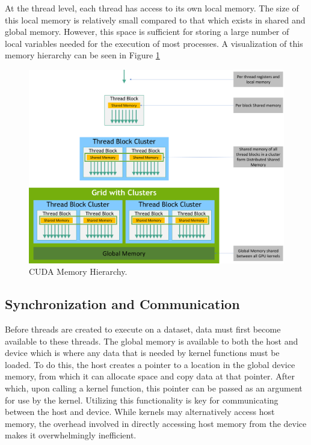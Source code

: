 \documentclass[11pt]{report}
\begin{document}
    At the thread level, each thread has access to its own local memory. The size of this local memory is relatively small compared to that which exists in shared and global memory. However, this space is sufficient for storing a large number of local variables needed for the execution of most processes. A visualization of this memory hierarchy can be seen in Figure \ref{fig:CUDA-Mem_Hierarchy}

    \begin{figure}[!h]
        \centering
        \includegraphics[width=\textwidth]{Images/memory-hierarchy.png}
        \caption{CUDA Memory Hierarchy\cite{CPP_GUIDE}.}
        \label{fig:CUDA-Mem_Hierarchy}
    \end{figure}

    

    \subsection{Synchronization and Communication}
    Before threads are created to execute on a dataset, data must first become available to these threads. The global memory is available to both the host and device which is where any data that is needed by kernel functions must be loaded. To do this, the host creates a pointer to a location in the global device memory, from which it can allocate space and copy data at that pointer. After which, upon calling a kernel function, this pointer can be passed as an argument for use by the kernel. Utilizing this functionality is key for communicating between the host and device. While kernels may alternatively access host memory, the overhead involved in directly accessing host memory from the device makes it overwhelmingly inefficient.
\end{document}
